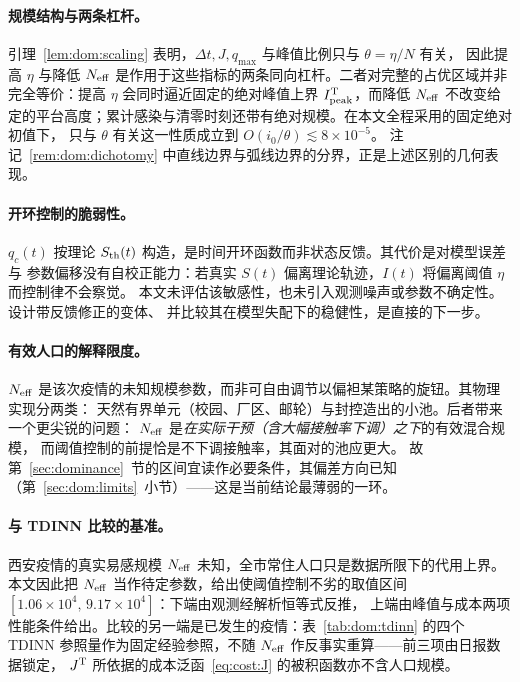 \documentclass[lang=cn,a4paper,newtx]{elegantpaper}
\numberwithin{equation}{section}
\theoremstyle{plain}
\begin{document}
\paragraph{规模结构与两条杠杆。}
引理~\ref{lem:dom:scaling} 表明，$\Delta t,J,q_{\max}$ 与峰值比例只与 $\theta=\eta/N$ 有关，
因此提高 $\eta$ 与降低 $N_{\rm eff}$ 是作用于这些指标的两条同向杠杆。二者对完整的占优区域并非
完全等价：提高 $\eta$ 会同时逼近固定的绝对峰值上界 $I_{\rm peak}^{\rm T}$，而降低 $N_{\rm eff}$
不改变给定的平台高度；累计感染与清零时刻还带有绝对规模。在本文全程采用的固定绝对初值下，
只与 $\theta$ 有关这一性质成立到 $O(i_0/\theta)\lesssim8\times10^{-5}$。
注记~\ref{rem:dom:dichotomy} 中直线边界与弧线边界的分界，正是上述区别的几何表现。

\paragraph{开环控制的脆弱性。}
$q_c(t)$ 按理论 $S_{\rm th}(t)$ 构造，是时间开环函数而非状态反馈。其代价是对模型误差与
参数偏移没有自校正能力：若真实 $S(t)$ 偏离理论轨迹，$I(t)$ 将偏离阈值 $\eta$ 而控制律不会察觉。
本文未评估该敏感性，也未引入观测噪声或参数不确定性。设计带反馈修正的变体、
并比较其在模型失配下的稳健性，是直接的下一步。

\paragraph{有效人口的解释限度。}
$N_{\rm eff}$ 是该次疫情的未知规模参数，而非可自由调节以偏袒某策略的旋钮。其物理实现分两类：
天然有界单元（校园、厂区、邮轮）与封控造出的小池。后者带来一个更尖锐的问题：
$N_{\rm eff}$ 是\emph{在实际干预（含大幅接触率下调）之下}的有效混合规模，
而阈值控制的前提恰是不下调接触率，其面对的池应更大。
故第~\ref{sec:dominance}~节的区间宜读作必要条件，其偏差方向已知
（第~\ref{sec:dom:limits}~小节）——这是当前结论最薄弱的一环。

\paragraph{与 TDINN 比较的基准。}
西安疫情的真实易感规模 $N_{\rm eff}$ 未知，全市常住人口只是数据所限下的代用上界。
本文因此把 $N_{\rm eff}$ 当作待定参数，给出使阈值控制不劣的取值区间
$[1.06\times10^{4},\,9.17\times10^{4}]$：下端由观测经解析恒等式反推，
上端由峰值与成本两项性能条件给出。比较的另一端是已发生的疫情：表~\ref{tab:dom:tdinn} 的四个
TDINN 参照量作为固定经验参照，不随 $N_{\rm eff}$ 作反事实重算——前三项由日报数据锁定，
$J^{\rm T}$ 所依据的成本泛函~\eqref{eq:cost:J} 的被积函数亦不含人口规模。
\end{document}
